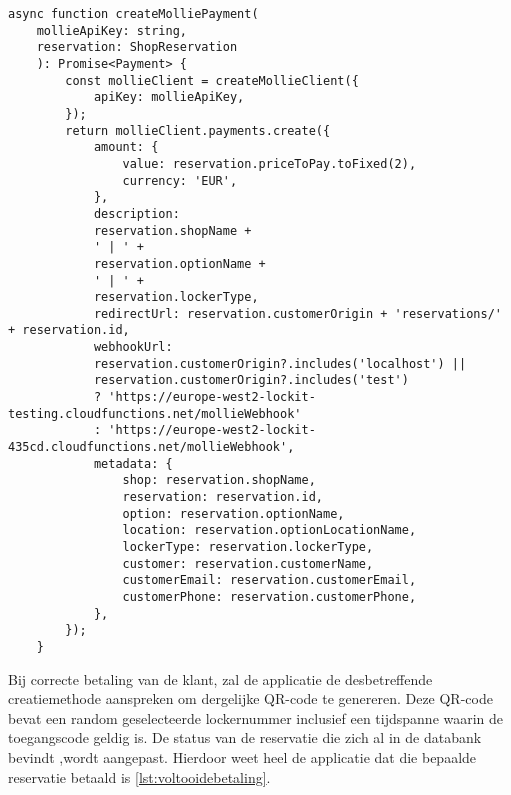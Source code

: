 \begin{lstlisting}[caption={Mollie betaling aanmaken met nodige data.}, label={lst:aanmakenBetalingMollie}]
    async function createMolliePayment(
    mollieApiKey: string,
    reservation: ShopReservation
    ): Promise<Payment> {
        const mollieClient = createMollieClient({
            apiKey: mollieApiKey,
        });
        return mollieClient.payments.create({
            amount: {
                value: reservation.priceToPay.toFixed(2),
                currency: 'EUR',
            },
            description:
            reservation.shopName +
            ' | ' +
            reservation.optionName +
            ' | ' +
            reservation.lockerType,
            redirectUrl: reservation.customerOrigin + 'reservations/' + reservation.id,
            webhookUrl:
            reservation.customerOrigin?.includes('localhost') ||
            reservation.customerOrigin?.includes('test')
            ? 'https://europe-west2-lockit-testing.cloudfunctions.net/mollieWebhook'
            : 'https://europe-west2-lockit-435cd.cloudfunctions.net/mollieWebhook',
            metadata: {
                shop: reservation.shopName,
                reservation: reservation.id,
                option: reservation.optionName,
                location: reservation.optionLocationName,
                lockerType: reservation.lockerType,
                customer: reservation.customerName,
                customerEmail: reservation.customerEmail,
                customerPhone: reservation.customerPhone,
            },
        });
    }
    \end{lstlisting}

Bij correcte betaling van de klant, zal de applicatie de desbetreffende creatiemethode aanspreken om dergelijke QR-code te genereren. Deze QR-code bevat een random geselecteerde lockernummer inclusief een tijdspanne waarin de toegangscode geldig is. De status van de reservatie die zich al in de databank bevindt ,wordt aangepast. Hierdoor weet heel de applicatie dat die bepaalde reservatie betaald is \ref{lst:voltooidebetaling}.


